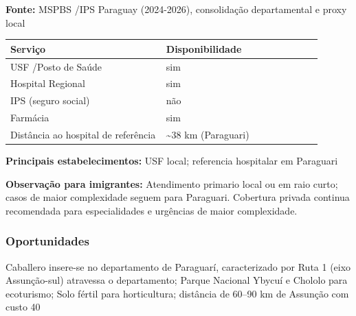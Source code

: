 \textbf{Fonte:} MSPBS /\allowbreak  IPS Paraguay (2024-2026), consolidação
departamental e proxy local

{\def\LTcaptype{none} %
\begin{longtable}{@{}>{\raggedright\arraybackslash}p{0.45\linewidth} >{\raggedright\arraybackslash}p{0.45\linewidth}@{}}
\toprule\noalign{}
Serviço & Disponibilidade \\
\midrule\noalign{}
\endhead
\bottomrule\noalign{}
\endlastfoot
USF /\allowbreak  Posto de Saúde & sim \\
Hospital Regional & sim \\
IPS (seguro social) & não \\
Farmácia & sim \\
Distância ao hospital de referência & \textasciitilde38 km
(Paraguari) \\
\end{longtable}
}

\textbf{Principais estabelecimentos:} USF local; referencia hospitalar
em Paraguari

\textbf{Observação para imigrantes:} Atendimento primario local ou em
raio curto; casos de maior complexidade seguem para Paraguari. Cobertura
privada continua recomendada para especialidades e urgências de maior
complexidade.
\newpage

\subsubsection*{Oportunidades}\label{oport-caballero-0904}
Caballero insere-se no departamento de Paraguarí, caracterizado por Ruta 1 (eixo Assunção-sul) atravessa o departamento; Parque Nacional Ybycuí e Chololo para ecoturismo; Solo fértil para horticultura; distância de 60–90 km de Assunção com custo 40%

